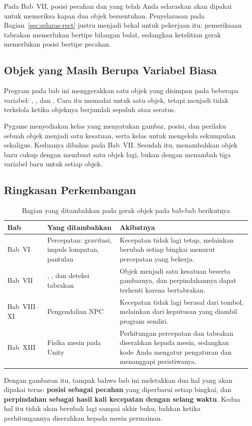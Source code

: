Pada Bab~VII, posisi pecahan dan  yang telah Anda selaraskan akan
dipakai untuk memeriksa kapan dua objek bersentuhan. Penyelarasan pada
Bagian~\ref{sec:selaras-rect} justru menjadi bekal untuk
pekerjaan itu: pemeriksaan tabrakan memerlukan  bertipe bilangan
bulat, sedangkan ketelitian gerak memerlukan posisi bertipe pecahan.

\subsection{Objek yang Masih Berupa Variabel Biasa}

Program pada bab ini menggerakkan satu objek yang disimpan pada beberapa
variabel: , , dan . Cara itu
memadai untuk satu objek, tetapi menjadi tidak terkelola ketika objeknya
berjumlah sepuluh atau seratus.

Pygame menyediakan kelas  yang menyatukan gambar, posisi, dan
perilaku sebuah objek menjadi satu kesatuan, serta kelas  untuk
mengelola sekumpulan  sekaligus. Keduanya dibahas pada
Bab~VII. Sesudah itu, menambahkan objek baru cukup dengan membuat satu objek
lagi, bukan dengan menambah tiga variabel baru untuk setiap objek.

\subsection{Ringkasan Perkembangan}

\begin{table}[htbp]
\centering
\caption{Bagian yang ditambahkan pada gerak objek pada bab-bab berikutnya}
\label{tab:perkembangan-gerak}
{\setlength{\tabcolsep}{4pt}\footnotesize%
\begin{tabularx}{\textwidth}{@{}C{1.6cm} L{5.0cm} Y@{}}
\toprule
\headrow \textbf{Bab} & \textbf{Yang ditambahkan} & \textbf{Akibatnya} \\
\midrule
Bab~VI & Percepatan: gravitasi, impuls lompatan, pantulan &
Kecepatan tidak lagi tetap, melainkan berubah setiap bingkai menurut
percepatan yang bekerja. \\
\addlinespace
Bab~VII & , , dan deteksi tabrakan &
Objek menjadi satu kesatuan beserta gambarnya, dan perpindahannya dapat
terhenti karena bertabrakan. \\
\addlinespace
Bab~VIII--XI & Pengendalian NPC &
Kecepatan tidak lagi berasal dari tombol, melainkan dari keputusan yang
diambil program sendiri. \\
\addlinespace
Bab~XIII & Fisika mesin pada Unity &
Perhitungan percepatan dan tabrakan diserahkan kepada mesin, sedangkan kode
Anda mengatur pengaturan dan menanggapi peristiwanya. \\
\bottomrule
\end{tabularx}}
\end{table}

Dengan gambaran itu, tampak bahwa bab ini meletakkan dua hal yang akan dipakai
terus: \textbf{posisi sebagai pecahan} yang diperbarui setiap bingkai, dan
\textbf{perpindahan sebagai hasil kali kecepatan dengan selang waktu}. Kedua
hal itu tidak akan berubah lagi sampai akhir buku, bahkan ketika
perhitungannya diserahkan kepada mesin permainan.
